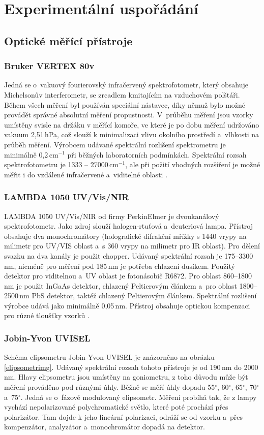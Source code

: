 \chapter{Experimentální uspořádání}

\section{Optické měřící přístroje}

\subsection{Bruker VERTEX 80v}
Jedná se o~vakuový fourierovský infračervený spektrofotometr, který obsahuje Michelsonův interferometr, se zrcadlem kmitajícím na vzduchovém polštáři. Během všech měření byl používán speciální nástavec, díky němuž bylo možné provádět správné absolutní měření propustnosti. V~průběhu měření jsou vzorky umístěny svisle na držáku v měřící komoře, ve které je po dobu měření udržováno vakuum 2,51\,hPa, což slouží k minimalizaci vlivu okolního prostředí a~vlhkosti na průběh měření. Výrobcem udávané spektrální rozlišení spektrometru je minimálně 0,2\,cm$^{-1}$ při běžných laboratorních podmínkách. Spektrální rozsah spektrofotometru je 1333 -- 27000\,cm$^{-1}$, ale při požití vhodných rozšíření je možné měřit i do vzdálené infračervené a~viditelné oblasti \cite{vertex}.

\subsection{LAMBDA 1050 UV/Vis/NIR}
LAMBDA 1050 UV/Vis/NIR od firmy PerkinElmer je dvoukanálový spektrofotometr. Jako zdroj slouží halogen-rtuťová a~deuteriová lampa.  Přístroj obsahuje dva monochromátory (holografické difrakční mřížky s 1440 vrypy na milimetr pro UV/VIS oblast a~s 360 vrypy na milimetr pro IR oblast). Pro dělení svazku na dva kanály je použit chopper. Udávaný spektrální rozsah je 175--3300\,nm, nicméně pro měření pod 185\,nm je potřeba chlazení dusíkem. Použitý detektor pro viditelnou a~UV oblast je fotonásobič R6872. Pro oblast 860--1800\,nm je použit InGaAs detektor, chlazený Peltierovým článkem a~pro oblast 1800--2500\,nm PbS detektor, taktéž chlazený Peltierovým článkem. Spektrální rozlišení výrobce udává jako minimálně 0,05\,nm. Přístroj obsahuje optickou kompenzaci pro různé tloušťky vzorků \cite{lambda}.

\subsection{Jobin-Yvon UVISEL}
Schéma elipsometru Jobin-Yvon UVISEL je znázorněno na obrázku \ref{elipsometrimg}. Udávaný spektrální rozsah tohoto přístroje je od 190\,nm do 2000\,nm. Hlavy elipsometru jsou umístěny na goniometru, z toho důvodu může být měření prováděno pod různými úhly. Běžně se měří úhly dopadu 55$^\circ$, 60$^\circ$, 65$^\circ$, 70$^\circ$ a~75$^\circ$. Jedná se o~fázově modulovaný elipsometr. Měření probíhá tak, že z lampy vychází nepolarizované polychromatické světlo, které poté prochází přes polarizátor. Tam dojde k jeho lineární polarizaci, odráží se od vzorku a~přes kompenzátor, analyzátor a~monochromátor dopadá na detektor.

